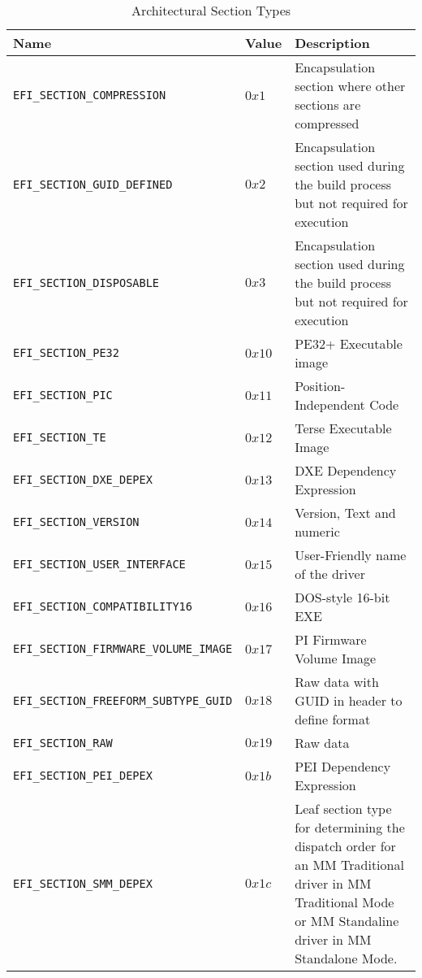 \begin{table}[!htbp]
	\centering
	\renewcommand{\arraystretch}{1.2}
	\caption{Architectural Section Types}\label{table:architectural-section-types}
	\begin{tabular}{p{7cm} | l | p{5cm}}
		Name & Value & Description
		\\ \hline \hline
		\verb|EFI_SECTION_COMPRESSION| & $ 0x1 $ & Encapsulation section where other sections are compressed
		\\ \hline
		\verb|EFI_SECTION_GUID_DEFINED| & $ 0x2 $ & Encapsulation section used during the build process but not required for execution
		\\ \hline
		\verb|EFI_SECTION_DISPOSABLE| & $ 0x3 $ & Encapsulation section used during the build process but not required for execution
		\\ \hline
		\verb|EFI_SECTION_PE32| & $ 0x10 $ & PE32+ Executable image
		\\ \hline
		\verb|EFI_SECTION_PIC| & $ 0x11 $ & Position-Independent Code
		\\ \hline
		\verb|EFI_SECTION_TE| & $ 0x12 $ & Terse Executable Image
		\\ \hline
		\verb|EFI_SECTION_DXE_DEPEX| & $ 0x13 $ & DXE Dependency Expression
		\\ \hline
		\verb|EFI_SECTION_VERSION| & $ 0x14 $ & Version, Text and numeric
		\\ \hline
		\verb|EFI_SECTION_USER_INTERFACE| & $ 0x15 $ & User-Friendly name of the driver
		\\ \hline
		\verb|EFI_SECTION_COMPATIBILITY16| & $ 0x16 $ & DOS-style 16-bit EXE
		\\ \hline
		\verb|EFI_SECTION_FIRMWARE_VOLUME_IMAGE| & $ 0x17 $ & PI Firmware Volume Image
		\\ \hline
		\verb|EFI_SECTION_FREEFORM_SUBTYPE_GUID| & $ 0x18 $ & Raw data with GUID in header to define format
		\\ \hline
		\verb|EFI_SECTION_RAW| & $ 0x19 $ & Raw data
		\\ \hline
		\verb|EFI_SECTION_PEI_DEPEX| & $ 0x1b $ & PEI Dependency Expression
		\\ \hline
		\verb|EFI_SECTION_SMM_DEPEX| & $ 0x1c $ & Leaf section type for determining the dispatch order for an MM Traditional driver in MM Traditional Mode or MM Standaline driver in MM Standalone Mode.
		\\ \hline
	\end{tabular}
\end{table}

